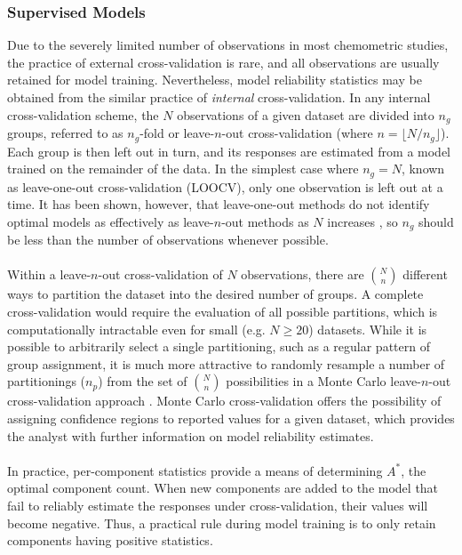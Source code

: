 \subsubsection{Supervised Models}

\begin{doublespace}
Due to the severely limited number of observations in most chemometric studies,
the practice of external cross-validation is rare, and all observations are
usually retained for model training. Nevertheless, model reliability statistics
may be obtained from the similar practice of \emph{internal} cross-validation.
In any internal cross-validation scheme, the $N$ observations of a given
dataset are divided into $n_g$ groups, referred to as $n_g$-fold or
leave-$n$-out cross-validation (where $n = \lfloor N / n_g \rfloor$). Each
group is then left out in turn, and its responses are estimated from a model
trained on the remainder of the data. In the simplest case where $n_g = N$,
known as leave-one-out cross-validation (LOOCV), only one observation is left
out at a time. It has been shown, however, that leave-one-out methods do not
identify optimal models as effectively as leave-$n$-out methods as $N$
increases \cite{shao:jasa1993}, so $n_g$ should be less than the number of
observations whenever possible.
\\\\
Within a leave-$n$-out cross-validation of $N$ observations, there are
$\binom{N}{n}$ different ways to partition the dataset into the desired
number of groups. A complete cross-validation would require the evaluation
of all possible partitions, which is computationally intractable even for
small (e.g. $N \ge 20$) datasets. While it is possible to arbitrarily select
a single partitioning, such as a regular pattern of group assignment, it is
much more attractive to randomly resample a number of partitionings ($n_p$)
from the set of $\binom{N}{n}$ possibilities in a Monte Carlo leave-$n$-out
cross-validation approach \cite{xu:cils2001}. Monte Carlo cross-validation
offers the possibility of assigning confidence regions to reported \qsq{}
values for a given dataset, which provides the analyst with further information
on model reliability estimates.
\\\\
In practice, per-component \qsq{} statistics provide a means of determining
$A^\ast$, the optimal component count. When new components are added to the
model that fail to reliably estimate the responses under cross-validation,
their \qsq{} values will become negative. Thus, a practical rule during model
training is to only retain components having positive \qsq{} statistics.
\end{doublespace}

